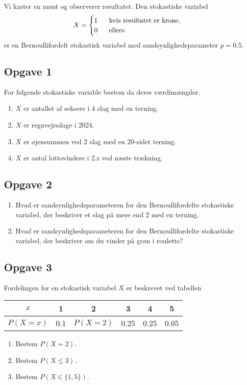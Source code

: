\begin{exa}
	Vi kaster en mønt og observerer resultatet. Den stokastiske variabel
	\begin{align*}
		X = \begin{cases}
			1 \ &\textnormal{ hvis resultatet er krone}, \\
			0 \ &\textnormal{ ellers.}
		\end{cases}
	\end{align*}
	er en Bernoullifordelt stokastisk variabel med sandsynlighedsparameter $p = 0.5$.
\end{exa}

\subsection*{Opgave 1}
For følgende stokastiske variable bestem da deres værdimængder.
\begin{enumerate}[label=\roman*)]
	\item $X$ er antallet af seksere i 4 slag med en terning.
	\item $X$ er regnvejrsdage i 2024.
	\item $X$ er øjensummen ved 2 slag med en 20-sidet terning.
	\item $X$ er antal lottovindere i 2.z ved næste trækning.
\end{enumerate}

\subsection*{Opgave 2}
\begin{enumerate}[label=\roman*)]
	\item Hvad er sandsynlighedsparameteren for den Bernoullifordelte stokastiske variabel, der beskriver et slag på mere end 2 med en terning.
	\item Hvad er sandsynlighedsparameteren for den Bernoullifordelte stokastiske variabel, der beskriver om du vinder på grøn i roulette?
\end{enumerate}

\subsection*{Opgave 3}

Fordelingen for en stokastisk variabel $X$ er beskrevet ved tabellen
\begin{center}
	\begin{tabular}{c|c|c|c|c|c}
		$x$ & 1 & 2 & 3 & 4 & 5 \\
		\hline
		$P(X = x)$ & 0.1 & $P(X = 2)$ & 0.25 & 0.25 & 0.05 
	\end{tabular}
\end{center}
\begin{enumerate}[label=\roman*)]
	\item Bestem $P(X = 2)$.
	\item Bestem $P(X \leq 3)$.
	\item Bestem $P(X \in \{1,5\})$.
\end{enumerate}

